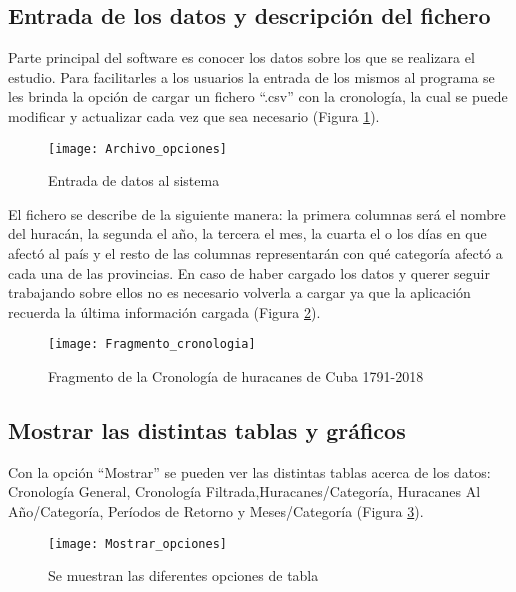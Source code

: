 \pagebreak

\subsection{Entrada de los datos y descripción del fichero}

Parte principal del software es conocer los datos sobre los que se realizara el estudio. Para facilitarles a los usuarios la entrada de los mismos al programa se les brinda la opción de cargar un fichero ``.csv'' con la cronología, la cual se puede modificar y actualizar cada vez que sea necesario (Figura \ref{fig:Archivo_opciones}).


\begin{figure}[H]
\centering
\texttt{[image: Archivo\_opciones]}
\caption{Entrada de datos al sistema}
\label{fig:Archivo_opciones}
\end{figure}

\pagebreak

El fichero se describe de la siguiente manera: la primera columnas será el nombre del huracán, la segunda el año, la tercera el mes, la cuarta el o los días en que afectó al país y el resto de las columnas representarán con qué categoría afectó a cada una de las provincias. En caso de haber cargado los datos y querer seguir trabajando sobre ellos no es necesario volverla a cargar ya que la aplicación recuerda la última información cargada  (Figura \ref{fig:Fragmento_cronologia}).


\begin{figure}[H]
\centering
\texttt{[image: Fragmento\_cronologia]}
\caption{Fragmento de la Cronología de huracanes de Cuba 1791-2018}
\label{fig:Fragmento_cronologia}
\end{figure}

\pagebreak

\subsection{Mostrar las distintas tablas y gráficos}

Con la opción ``Mostrar'' se pueden ver las distintas tablas acerca de los datos: Cronología General, Cronología Filtrada,Huracanes/Categoría, Huracanes Al Año/Categoría, Períodos de Retorno y Meses/Categoría (Figura \ref{fig:Mostrar_opciones}).\\

\begin{figure}[H]
\centering
\texttt{[image: Mostrar\_opciones]}
\caption{Se muestran las diferentes opciones de tabla}
\label{fig:Mostrar_opciones}
\end{figure}

